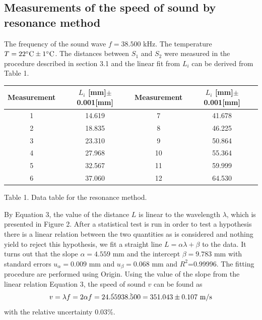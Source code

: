 \documentclass[a4paper]{report}
\begin{document}
	\subsection{Measurements of the speed of sound by resonance method}
	The frequency of the sound wave $f=38.500$ kHz. The temperature $T=22 ^\circ {\rm C} \pm 1 ^\circ {\rm C}$.
	The distances between $S_1$ and $S_2$ were measured in the procedure described in section 3.1 and the linear fit from $L_i$ can be derived from Table 1.
	\begin{tabular}{|c|c||c|c|}
		\hline
		Measurement&$L_i$ [mm]$\pm$0.001[mm]&Measurement&$L_i$ [mm]$\pm$0.001[mm]\\
		\hline
		1&14.619&7&41.678\\
		\hline
		2&18.835&8&46.225\\
		\hline
		3&23.310&9&50.864\\
		\hline
		4&27.968&10&55.364\\
		\hline
		5&32.567&11&59.999\\
		\hline
		6&37.060&12&64.530\\
		\hline
	\end{tabular}
	\begin{center}
		Table 1. Data table for the resonance method.
	\end{center}
	By Equation 3, the value of the distance $L$ is linear to the wavelength $\lambda$, which is presented in Figure 2. After a statistical test is run in order to test a hypothesis there is a linear relation between the two quantities as is considered and nothing yield to reject this hypothesis, we fit a straight line $L=\alpha \lambda+\beta$ to the data. It turns out that the slope $\alpha=4.559$ mm and the intercept $\beta=9.783$ mm with standard errors $u_\alpha=0.009$ mm and $u_\beta=0.068$ mm and $R^2$=0.99996. The fitting procedure are performed using Origin.
	Using the value of the slope from the linear relation Equation 3, the speed of sound $v$ can be found as
	\begin{equation}
	v=\lambda f=2\alpha f=2\dot{4.559}\dot{38.500}=351.043\pm0.107\ \rm{m/s}
	\end{equation}
	with the relative uncertainty 0.03\%.
\end{document}
